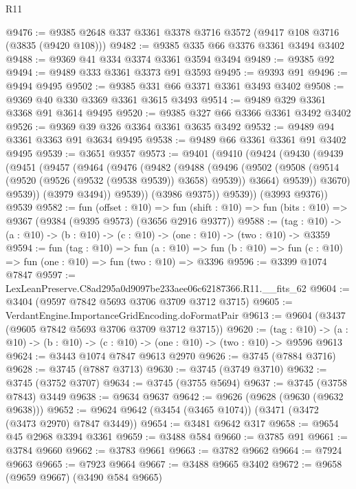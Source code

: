 \begin{lexlean}{R11}
\begin{coremodule}
@9476 := @9385 @2648 @337 @3361 @3378 @3716 @3572 (@9417 @108 @3716 (@3835 (@9420 @108)))
@9482 := @9385 @335 @66 @3376 @3361 @3494 @3402
@9488 := @9369 @41 @334 @3374 @3361 @3594 @3494
@9489 := @9385 @92
@9494 := @9489 @333 @3361 @3373 @91 @3593
@9495 := @9393 @91
@9496 := @9494 @9495
@9502 := @9385 @331 @66 @3371 @3361 @3493 @3402
@9508 := @9369 @40 @330 @3369 @3361 @3615 @3493
@9514 := @9489 @329 @3361 @3368 @91 @3614 @9495
@9520 := @9385 @327 @66 @3366 @3361 @3492 @3402
@9526 := @9369 @39 @326 @3364 @3361 @3635 @3492
@9532 := @9489 @94 @3361 @3363 @91 @3634 @9495
@9538 := @9489 @66 @3361 @3361 @91 @3402 @9495
@9539 := @3651 @9357
@9573 := @9401
    (@9410
      (@9424
        (@9430
          (@9439
            (@9451
              (@9457
                (@9464
                  (@9476
                    (@9482
                      (@9488
                        (@9496
                          (@9502
                            (@9508 (@9514 (@9520 (@9526 (@9532 (@9538 @9539)) @3658) @9539)) @3664)
                            @9539))
                        @3670)
                      @9539))
                  (@3979 @3494))
                @9539))
            (@3986 @9375))
          @9539))
      (@3993 @9376))
    @9539
@9582 := fun (offset : @10) =>
  fun (shift : @10) => fun (bits : @10) => @9367 (@9384 (@9395 @9573) (@3656 @2916 @9377))
@9588 := (tag : @10) -> (a : @10) -> (b : @10) -> (c : @10) -> (one : @10) -> (two : @10) -> @3359
@9594 := fun (tag : @10) =>
  fun (a : @10) => fun (b : @10) => fun (c : @10) => fun (one : @10) => fun (two : @10) => @3396
@9596 := @3399 @1074 @7847
@9597 := LexLeanPreserve.C8ad295a0d9097be233aee06c62187366.R11.__fits_62
@9604 := @3404 (@9597 @7842 @5693 @3706 @3709 @3712 @3715)
@9605 := VerdantEngine.ImportanceGridEncoding.doFormatPair
@9613 := @9604 (@3437 (@9605 @7842 @5693 @3706 @3709 @3712 @3715))
@9620 := (tag : @10) ->
  (a : @10) -> (b : @10) -> (c : @10) -> (one : @10) -> (two : @10) -> @9596 @9613
@9624 := @3443 @1074 @7847 @9613 @2970
@9626 := @3745 (@7884 @3716)
@9628 := @3745 (@7887 @3713)
@9630 := @3745 (@3749 @3710)
@9632 := @3745 (@3752 @3707)
@9634 := @3745 (@3755 @5694)
@9637 := @3745 (@3758 @7843) @3449
@9638 := @9634 @9637
@9642 := @9626 (@9628 (@9630 (@9632 @9638)))
@9652 := @9624 @9642 (@3454 (@3465 @1074)) (@3471 (@3472 (@3473 @2970) @7847 @3449))
@9654 := @3481 @9642 @317
@9658 := @9654 @45 @2968 @3394 @3361
@9659 := @3488 @584
@9660 := @3785 @91
@9661 := @3784 @9660
@9662 := @3783 @9661
@9663 := @3782 @9662
@9664 := @7924 @9663
@9665 := @7923 @9664
@9667 := @3488 @9665 @3402
@9672 := @9658 (@9659 @9667) (@3490 @584 @9665)

\end{coremodule}
\end{lexlean}
